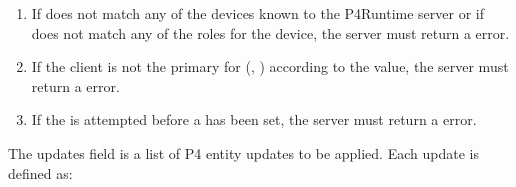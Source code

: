 \documentclass[11pt]{article}
\begin{document}
{%
\begin{enumerate}%

\item{}
If  does not match any of the devices known to the P4Runtime
server or if  does not match any of the roles for the device, the
server must return a  error.%

\item{}
If the client is not the primary for (, ) according to
the  value, the server must return a  error.%

\item{}
If the  is attempted before a  has been set,
the server must return a  error.%
\end{enumerate}%

\noindent{}The updates field is a list of P4 entity updates to be applied. Each update is
defined as:%

}
\end{document}
